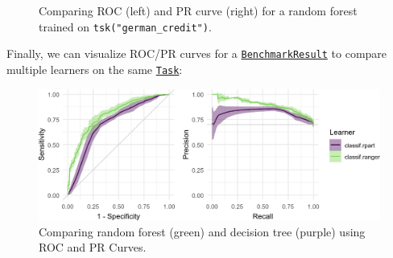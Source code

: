 \begin{figure}
\begin{minipage}[t]{0.50\linewidth}
{{}

}

\end{minipage}%

\caption{\label{fig-basics-rocpr-ranger}Comparing ROC (left) and PR
curve (right) for a random forest trained on
\texttt{tsk("german\_credit")}.}

\end{figure}

Finally, we can visualize ROC/PR curves for a
\href{https://mlr3.mlr-org.com/reference/BenchmarkResult.html}{\texttt{BenchmarkResult}}
to compare multiple learners on the same
\href{https://mlr3.mlr-org.com/reference/Task.html}{\texttt{Task}}:

\begin{Shaded}
\begin{Highlighting}[]

\OtherTok{=} \NormalTok{(}
   \NormalTok{(}\NormalTok{),}
   \NormalTok{(}\NormalTok{(}\NormalTok{, }\NormalTok{),}
     \NormalTok{),}
   \NormalTok{(}\NormalTok{, } \NormalTok{)}
\NormalTok{)}
\OtherTok{=} 
 \NormalTok{) }\SpecialCharTok{+}  \NormalTok{) }\SpecialCharTok{+}
  \NormalTok{(} \NormalTok{)}
\end{Highlighting}
\end{Shaded}

\begin{figure}

{\centering \includegraphics[width=1\textwidth,height=\textheight]{chapters/chapter3/evaluation_and_benchmarking_files/figure-pdf/fig-basics-rocpr-bmr-1.png}

}

\caption{\label{fig-basics-rocpr-bmr}Comparing random forest (green) and
decision tree (purple) using ROC and PR Curves.}

\end{figure}

